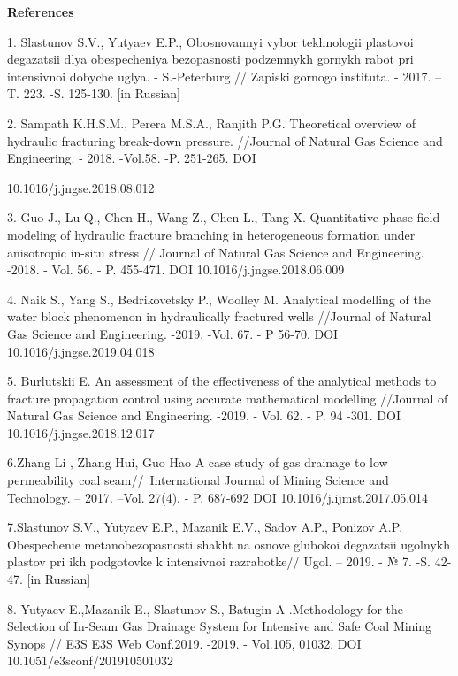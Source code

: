 \begin{center}
{\bfseries References}
\end{center}

\begin{noparindent}
1. Slastunov S.V., Yutyaev E.P., Obosnovannyi vybor tekhnologii
plastovoi degazatsii dlya obespecheniya bezopasnosti podzemnykh gornykh
rabot pri intensivnoi dobyche uglya. - S.-Peterburg // Zapiski gornogo
instituta. - 2017. --T. 223. -S. 125-130. {[}in Russian{]}

2. Sampath K.H.S.M., Perera M.S.A., Ranjith P.G. Theoretical overview of
hydraulic fracturing break-down pressure. //Journal of Natural Gas
Science and Engineering. - 2018. -Vol.58. -P. 251-265. DOI

10.1016/j.jngse.2018.08.012

3. Guo J., Lu Q., Chen H., Wang Z., Chen L., Tang X. Quantitative phase
field modeling of hydraulic fracture branching in heterogeneous
formation under anisotropic in-situ stress // Journal of Natural Gas
Science and Engineering. -2018. - Vol. 56. - P. 455-471. DOI
10.1016/j.jngse.2018.06.009

4. Naik S., Yang S., Bedrikovetsky P., Woolley M. Analytical modelling
of the water block phenomenon in hydraulically fractured wells //Journal
of Natural Gas Science and Engineering. -2019. -Vol. 67. - P 56-70. DOI
10.1016/j.jngse.2019.04.018

5. Burlutskii E. An assessment of the effectiveness of the analytical
methods to fracture propagation control using accurate mathematical
modelling //Journal of Natural Gas Science and Engineering. -2019. -
Vol. 62. - P. 94 -301. DOI 10.1016/j.jngse.2018.12.017

6.Zhang Li , Zhang Hui, Guo Hao A case study of gas drainage to low
permeability coal seam//~International Journal of Mining Science and
Technology. -- 2017. --Vol. 27(4). - P. 687-692 DOI
10.1016/j.ijmst.2017.05.014

7.Slastunov S.V., Yutyaev E.P., Mazanik E.V., Sadov A.P., Ponizov A.P.
Obespechenie metanobezopasnosti shakht na osnove glubokoi degazatsii
ugol\textquotesingle nykh plastov pri ikh podgotovke k intensivnoi
razrabotke// Ugol\textquotesingle. -- 2019. - № 7. -S. 42-47. {[}in
Russian{]}

8. Yutyaev E.,Mazanik E., Slastunov S., Batugin A .Methodology for the
Selection of In-Seam Gas Drainage System for Intensive and Safe Coal
Mining Synops // E3S E3S Web Conf.2019. -2019. - Vol.105, 01032. DOI
10.1051/e3sconf/201910501032


\end{noparindent}
